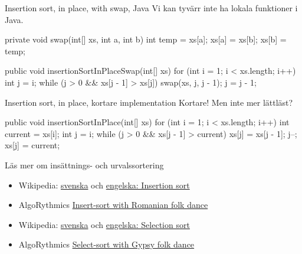 \begin{Slide}{Insertion sort, in place, with swap, Java}
Vi kan tyvärr inte ha lokala funktioner i Java.
\begin{Code}[language=Java]
private void swap(int[] xs, int a, int b) {
    int temp = xs[a];
    xs[a] = xs[b];
    xs[b] = temp;
}

public void insertionSortInPlaceSwap(int[] xs) {
    for (int i = 1; i < xs.length; i++) {
        int j = i;
        while (j > 0 && xs[j - 1] > xs[j]) {
            swap(xs, j, j - 1);
            j = j - 1;
        }
    }
}
\end{Code}
\end{Slide}

\begin{Slide}{Insertion sort, in place, kortare implementation}
Kortare! Men inte mer lättläst?
\begin{Code}[language=Java]
    public void insertionSortInPlace(int[] xs) {
        for (int i = 1; i < xs.length; i++) {
            int current = xs[i];
            int j = i;
            while (j > 0 && xs[j - 1] > current) {
                xs[j] = xs[j - 1];
                j--;
            }
            xs[j] = current;
        }
    }
\end{Code}

\end{Slide}

\begin{Slide}{Läs mer om insättnings- och urvalssortering}
\begin{itemize}
\item Wikipedia: \href{https://sv.wikipedia.org/wiki/Ins\%C3\%A4ttningssortering}{svenska} och 
\href{https://en.wikipedia.org/wiki/Insertion_sort}{engelska: Insertion sort} 

\item AlgoRythmics \href{https://www.youtube.com/watch?v=ROalU379l3U}{Insert-sort with Romanian folk dance  }
\end{itemize}

\vspace{2em}

\begin{itemize}
\item Wikipedia: \href{https://sv.wikipedia.org/wiki/Urvalssortering}{svenska} och 
\href{https://en.wikipedia.org/wiki/Selection_sort}{engelska: Selection sort} 

\item AlgoRythmics \href{https://www.youtube.com/watch?v=Ns4TPTC8whw}{Select-sort with Gypsy folk dance }
\end{itemize}
\end{Slide}

